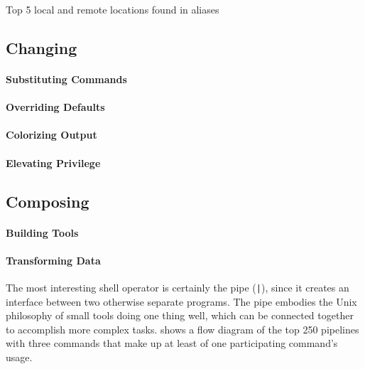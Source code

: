 \begin{table}
    \caption{Top 5 local and remote locations found in aliases}
    \label{tab:locations}
    
\end{table}

\subsection{Changing}

\paragraph{\bf Substituting Commands}

\paragraph{\bf Overriding Defaults}

\paragraph{\bf Colorizing Output}

\paragraph{\bf Elevating Privilege}

\subsection{Composing}

\paragraph{\bf Building Tools}

\paragraph{\bf Transforming Data}

The most interesting shell operator is certainly the pipe (\verb`|`), since it creates an interface between two otherwise separate programs.
The pipe embodies the Unix philosophy of small tools doing one thing well, which can be connected together to accomplish more complex tasks.
 shows a flow diagram of the top 250 pipelines with three commands that make up at least  of one participating command's usage.
\TODO

